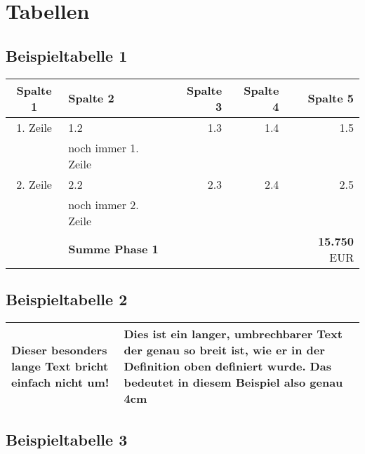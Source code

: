 \section{Tabellen}
\subsection{Beispieltabelle 1}
\small
\vspace{0.1in}
\begin{tabular}{|c|l|r|r|r|} \hline   %
    \textbf{Spalte 1} &
    \textbf{Spalte 2}









    &
    \textbf{Spalte 3} &
    \textbf{Spalte 4} &
    \textbf{Spalte 5} \\ \hline \hline

1. Zeile  &  1.2 &  1.3  & 1.4  & 1.5 \\
          &  noch immer 1. Zeile   &      &           &                 \\          \hline

2. Zeile  &  2.2 &  2.3  & 2.4  & 2.5 \\
          &  noch immer 2. Zeile   &      &           &                 \\ \hline   \hline

	      & \textbf{Summe Phase 1} &	  &           &   \textbf{15.750} EUR    \\ \hline

 \end{tabular}
\normalsize

\subsection{Beispieltabelle 2}
\small
\begin{tabular}{|l|p{4cm}|}
\hline Dieser besonders lange Text bricht einfach nicht um! &
Dies ist ein langer, umbrechbarer Text der genau
so breit ist, wie er in der Definition oben definiert wurde.
Das bedeutet in diesem Beispiel also genau 4cm\\
\hline
\end{tabular}

\subsection{Beispieltabelle 3}

